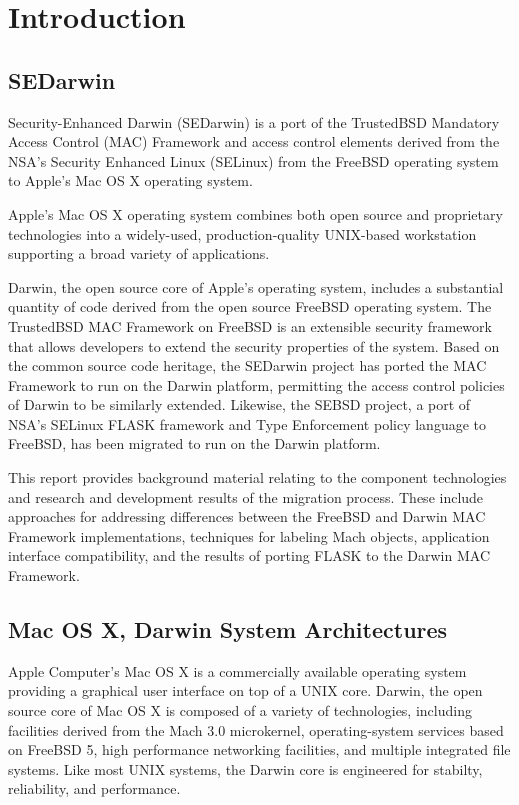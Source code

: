 \section{Introduction}

\subsection{SEDarwin}

Security-Enhanced Darwin (SEDarwin) is a port of the TrustedBSD
Mandatory Access Control (MAC) Framework and access control elements
derived from the NSA's Security Enhanced Linux (SELinux) from the
FreeBSD operating system to Apple's Mac OS X operating system.

Apple's Mac OS X operating system combines both open source and
proprietary technologies into a widely-used, production-quality
UNIX-based workstation supporting a broad variety of applications.

Darwin, the open source core of Apple's operating system, includes
a substantial quantity of code derived from the open source FreeBSD
operating system.  The TrustedBSD MAC Framework on FreeBSD is an
extensible security framework that allows developers to extend the
security properties of the system.  Based on the common source code
heritage, the SEDarwin project has ported the MAC Framework to run
on the Darwin platform, permitting the access control policies of
Darwin to be similarly extended.  Likewise, the SEBSD project, a
port of NSA's SELinux FLASK framework and Type Enforcement policy
language to FreeBSD, has been migrated to run on the Darwin platform.

This report provides background material relating to the component
technologies and research and development results of the migration
process. These include approaches for addressing differences between
the FreeBSD and Darwin MAC Framework implementations, techniques
for labeling Mach objects, application interface compatibility,
and the results of porting FLASK to the Darwin MAC Framework.

\subsection{Mac OS X, Darwin System Architectures}

Apple Computer's Mac OS X is a commercially available operating
system providing a graphical user interface on top of a UNIX core.
Darwin, the open source core of Mac OS X is composed of a variety
of technologies, including facilities derived from the Mach 3.0
microkernel, operating-system services based on FreeBSD 5, high
performance networking facilities, and multiple integrated file
systems.  Like most UNIX systems, the Darwin core is engineered for
stabilty, reliability, and performance.\cite{macosx,osxoverview}

